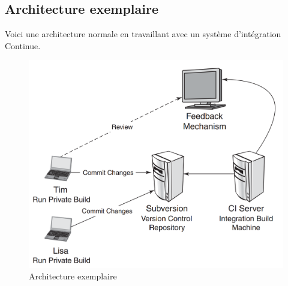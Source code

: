 \subsection{Architecture exemplaire}
Voici une architecture normale en travaillant avec un système d'intégration Continue.
\begin{figure}[H]
	\centering
		\includegraphics[scale=0.6]{bilder/architecture_exemplaire}
	\caption{Architecture exemplaire}
	\label{fig:processus}
\end{figure}

